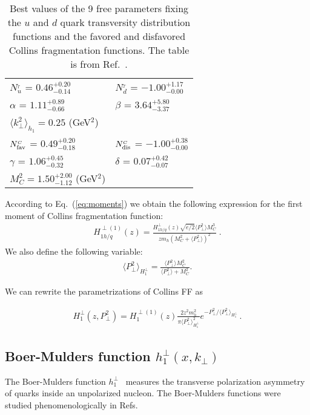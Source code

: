 \documentclass[a4paper,11pt]{article}
\newcommand{\ba}{\begin{eqnarray}}
\newcommand{\ea}{\end{eqnarray}}
\newcommand{\la}{\langle}
\newcommand{\ra}{\rangle}
\def\T{_{_T}}
\def\C{_{_C}}
\def\kperp{k_\perp}
\def\pperp{P_\perp}
\def\avkperp{\la \kperp^2 \ra}
\def\avpperp{\la \pperp^2 \ra}
\begin{document}
\begin{table}[h]
\centering
\renewcommand{\tabcolsep}{0.4pc} %
\renewcommand{\arraystretch}{1.2} %
\begin{tabular}{@{ }ll}
 \hline
 $N_{u}^{\T}$ = $0.46^{+0.20}_{-0.14}$ & $N_{d}^{\T}$ = $ -1.00^{+1.17}_{-0.00}$ \\
 $\alpha$ =  $1.11^{+0.89}_{-0.66}$ & $\beta$  = $3.64^{+5.80}_{-3.37}$ \\
 $\avkperp_{h_1} = 0.25$ (GeV$^2$) & \\
 \hline
 $N_{\rm fav}^{\C}$  = $0.49^{+0.20}_{-0.18}$ & $N_{\rm dis}^{\C}$  = 
 $-1.00^{+0.38}_{-0.00}$ \\
 $\gamma$  = $1.06^{+0.45}_{-0.32}$  & $\delta$   = $0.07^{+0.42}_{-0.07}$    \\
 $M^2_C = 1.50^{+2.00}_{-1.12}$ (GeV$^2$) & \\
 \hline
\end{tabular}
\caption{
Best values of the 9 free parameters fixing the $u$ and $d$ quark
transversity distribution functions and the favored and
disfavored Collins fragmentation functions. The table is from Ref.~\cite{Anselmino:2013vqa}.
\label{fitpar}}
\end{table}


According to Eq.~(\ref{eq:moments}) we obtain the following expression for the first moment of 
Collins fragmentation function: 
\ba
H_{1 h/q}^{\perp (1)}(z) = \frac{H_{1 h/q}^{\perp}(z) \sqrt{e/2}  \avpperp M_C^3}{z m_h  (M_C^2+\avpperp)^2}\; .
\ea 
We also define the following variable:
\ba
\avpperp_{H_1^\perp} = \frac{\avpperp M_C^2 }{\avpperp + M_C^2} .  
\ea

We can rewrite the parametrizations of Collins FF as

\ba
H_{1}^{\perp}(z,\pperp^2) =  H_{1}^{\perp (1)}(z)   \frac{2 z^2 m_h^2}{\pi \avpperp_{H_{1}^\perp}^2} e^{-\pperp^2/{\avpperp_{H_{1}^\perp}}}
\label{coll-funct_new} \, .
\ea

\subsection{\boldmath Boer-Mulders function $h_{1}^{\perp}(x,k_\perp)$} 
\label{App:basis-h1perp}

The Boer-Mulders function $h_{1}^{\perp}$~\cite{Boer:1997nt} measures 
the transverse polarization asymmetry of quarks inside an unpolarized 
nucleon. The Boer-Mulders functions were studied phenomenologically in 
Refs.~\cite{Barone:2009hw,Barone:2010gk,Barone:2015ksa}
\end{document}

